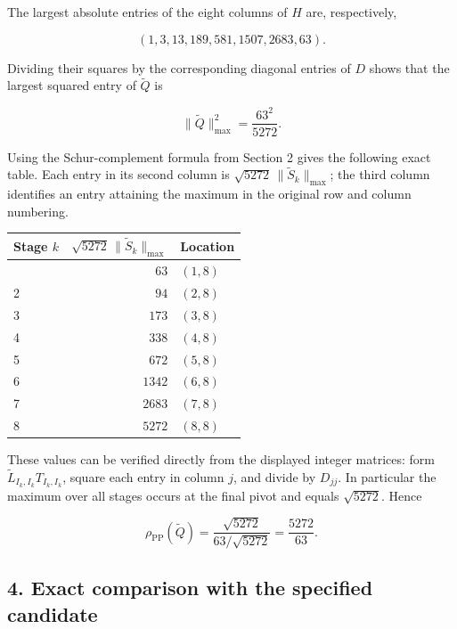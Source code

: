 \documentclass[10pt,a4paper]{article}
\newcounter{none} %
\begin{document}
The largest absolute entries of the eight columns of \(H\) are,
respectively,

\nopagebreak[4]

\[
(1,3,13,189,581,1507,2683,63).
\]

Dividing their squares by the corresponding diagonal entries of \(D\)
shows that the largest squared entry of \(\widetilde Q\) is

\nopagebreak[4]

\[
\|\widetilde Q\|_{\max}^2=\frac{63^2}{5272}.
\]

Using the Schur-complement formula from Section 2 gives the following
exact table. Each entry in its second column is
\(\sqrt{5272}\,\|\widetilde S_k\|_{\max}\); the third column identifies
an entry attaining the maximum in the original row and column numbering.

{\def\LTcaptype{none} %
\begin{longtable}[]{@{}lrl@{}}
\toprule\noalign{}
Stage \(k\) & \(\sqrt{5272}\,\|\widetilde S_k\|_{\max}\) & Location \\
\midrule\noalign{}
\endhead
\bottomrule\noalign{}
\endlastfoot
1 & \(63\) & \((1,8)\) \\
2 & \(94\) & \((2,8)\) \\
3 & \(173\) & \((3,8)\) \\
4 & \(338\) & \((4,8)\) \\
5 & \(672\) & \((5,8)\) \\
6 & \(1342\) & \((6,8)\) \\
7 & \(2683\) & \((7,8)\) \\
8 & \(5272\) & \((8,8)\) \\
\end{longtable}
}

These values can be verified directly from the displayed integer
matrices: form \(\widetilde L_{I_k,I_k}T_{I_k,I_k}\), square each entry
in column \(j\), and divide by \(D_{jj}\). In particular the maximum
over all stages occurs at the final pivot and equals \(\sqrt{5272}\).
Hence

\nopagebreak[4]

\[
\rho_{\mathrm{PP}}(\widetilde Q)
=\frac{\sqrt{5272}}{63/\sqrt{5272}}
=\frac{5272}{63}.
\]

\subsection{4. Exact comparison with the specified
candidate}\label{exact-comparison-with-the-specified-candidate}
\end{document}
